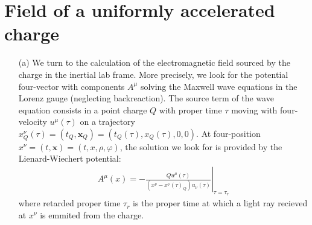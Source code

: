 \documentclass[10pt, a4paper]{article}
\begin{document}
\begin{enumerate}
\end{enumerate}

\section{Field of a uniformly accelerated charge}
\begin{enumerate}
  \item[(a)] We turn to the calculation of the electromagnetic field sourced by the charge in the inertial lab frame. More precisely, we look for the potential four-vector with components $A^{\mu}$ solving the Maxwell wave equations in the Lorenz gauge (neglecting backreaction). The source term of the wave equation consists in a point charge $Q$ with proper time $\tau$ moving with four-velocity $u^{\mu}(\tau)$ on a trajectory $x^{\nu}_Q(\tau) = (t_Q, \mathbf{x}_Q)=  (t_Q(\tau), x_Q(\tau), 0, 0)$. At four-position $x^\nu = (t, \mathbf{x}) = (t, x, \rho, \varphi)$, the solution we look for is provided by the Lienard-Wiechert potential:
  \begin{align*}
    A^\mu(x)=-\left.\frac{Q u^\mu(\tau)}{\left(x^\nu-x^\nu(\tau)_Q\right) u_\nu(\tau)}\right|_{\tau=\tau_r}
 \end{align*}
 where retarded proper time $\tau_r$ is the proper time at which a light ray recieved at $x^{\nu}$ is emmited from the charge. 
 

\end{enumerate}
\end{document}
